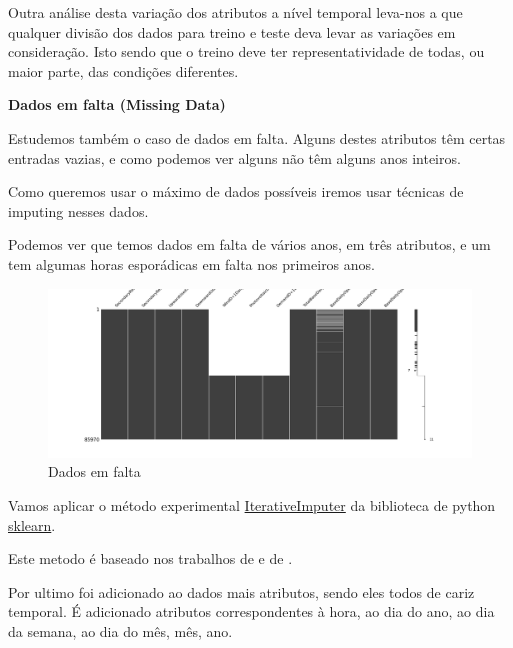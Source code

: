 Outra análise desta variação dos atributos a nível temporal leva-nos a que qualquer divisão dos dados para treino e teste deva levar as variações em consideração. Isto sendo que o treino deve ter representatividade de todas, ou maior parte, das condições diferentes.\par


\textbf{Dados em falta (Missing Data)}

Estudemos também o caso de dados em falta. Alguns destes atributos têm certas entradas vazias, e como podemos ver alguns não têm alguns anos inteiros.\par
Como queremos usar o máximo de dados possíveis iremos usar técnicas de imputing nesses dados.\par
Podemos ver que temos dados em falta de vários anos, em três atributos, e um tem algumas horas esporádicas em falta nos primeiros anos.\par

\begin{figure}[H]
  \centering
  \includegraphics[width=\textwidth]{plots/missing_data.png}
  \caption{Dados em falta}
\end{figure}

Vamos aplicar o método experimental \href{https://scikit-learn.org/stable/modules/generated/sklearn.impute.IterativeImputer.html}{IterativeImputer} da biblioteca de python \href{https://scikit-learn.org/stable/index.html}{sklearn}.\par
Este metodo é baseado nos trabalhos de \cite{vanBuuren2011} e de \cite{Buck1960}.\par
Por ultimo foi adicionado ao dados mais atributos, sendo eles todos de cariz temporal. É adicionado atributos correspondentes à hora, ao dia do ano, ao dia da semana, ao dia do mês, mês, ano.\par

